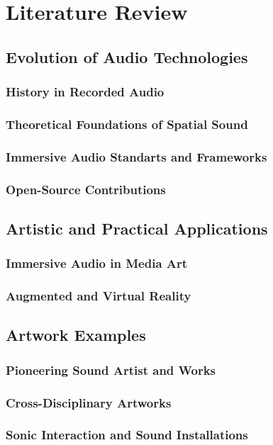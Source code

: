 \chapter{Literature Review}
    \section{Evolution of Audio Technologies}
        \subsection{History in Recorded Audio}
        \subsection{Theoretical Foundations of Spatial Sound}
        \subsection{Immersive Audio Standarts and Frameworks}
        \subsection{Open-Source Contributions}
    \section{Artistic and Practical Applications}
        \subsection{Immersive Audio in Media Art}
        \subsection{Augmented and Virtual Reality}
    \section{Artwork Examples}
        \subsection{Pioneering Sound Artist and Works}
        \subsection{Cross-Disciplinary Artworks}
        \subsection{Sonic Interaction and Sound Installations}
